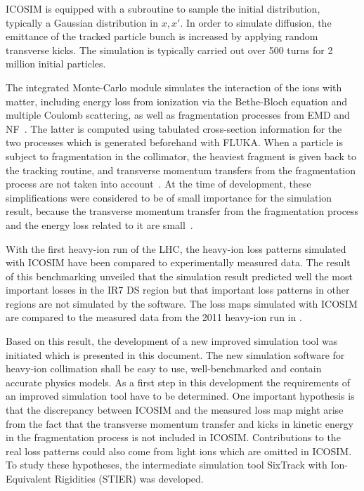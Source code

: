 ICOSIM is equipped with a subroutine to sample the initial distribution, typically a Gaussian distribution in $x,x'$. In order to simulate diffusion, the emittance of the tracked particle bunch is increased by applying random transverse kicks. The simulation is typically carried out over 500 turns for 2 million initial particles. 

The integrated Monte-Carlo module simulates the interaction of the ions with matter, including energy loss from ionization via the Bethe-Bloch equation and multiple Coulomb scattering, as well as fragmentation processes from EMD and NF~\cite{ICOSIMref02}. The latter is computed using tabulated cross-section information for the two processes which is generated beforehand with FLUKA. When a particle is subject to fragmentation in the collimator, the heaviest fragment is given back to the tracking routine, and transverse momentum transfers from the fragmentation process are not taken into account~\cite{ICOSIMref02}. At the time of development, these simplifications were considered to be of small importance for the simulation result, because the transverse momentum transfer from the fragmentation process and the energy loss related to it are small~\cite{ICOSIMref02}. 

With the first heavy-ion run of the LHC, the heavy-ion loss patterns simulated with ICOSIM have been compared to experimentally measured data. The result of this benchmarking unveiled that the simulation result predicted well the most important losses in the IR7 DS region but that important loss patterns in other regions are not simulated by the software. The loss maps simulated with ICOSIM are compared to the measured data from the 2011 heavy-ion run in . 

Based on this result, the development of a new improved simulation tool was initiated which is presented in this document. The new simulation software for heavy-ion collimation shall be easy to use, well-benchmarked and contain accurate physics models. As a first step in this development the requirements of an improved simulation tool have to be determined. One important hypothesis is that the discrepancy between ICOSIM and the measured loss map might arise from the fact that the transverse momentum transfer and kicks in kinetic energy in the fragmentation process is not included in ICOSIM. Contributions to the real loss patterns could also come from light ions which are omitted in ICOSIM. To study these hypotheses, the intermediate simulation tool SixTrack with Ion-Equivalent Rigidities (STIER) was developed. 


